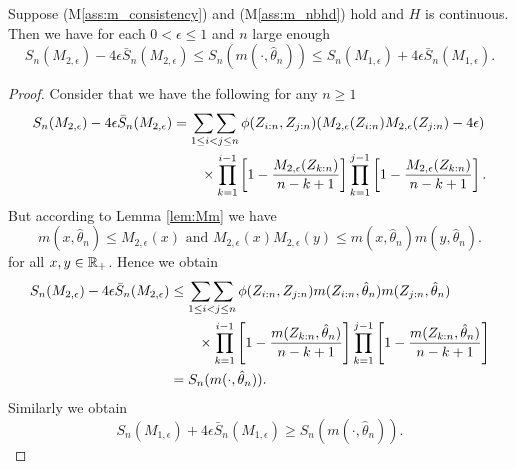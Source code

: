 \begin{cor}
	Suppose (M\ref{ass:m_consistency}) and (M\ref{ass:m_nbhd}) hold and $H$ is continuous. Then we have for each $0 < \epsilon \leq 1$ and $n$ large enough
	$$S_n(M_{2,\epsilon}) - 4\epsilon \bar{S}_n(M_{2,\epsilon}) \leq S_n(m(\cdot, \hat\theta_n)) \leq S_n(M_{1,\epsilon}) + 4\epsilon \bar{S}_n(M_{1,\epsilon})\textrm{.}$$
	\label{lem:sandwich}
	\begin{proof}
		Consider that we have the following for any $n\geq 1$
		\begin{align*}
			S_n(M_{2,\epsilon}) - 4\epsilon \bar{S}_n(M_{2,\epsilon}) &= \mathop{\sum\sum}\limits_{1\leq i<j\leq n} \phi(Z_{i:n}, Z_{j:n}) (M_{2,\epsilon}(Z_{i:n}) M_{2,\epsilon}(Z_{j:n}) - 4\epsilon) \\
			&\qquad \times \prod_{k=1}^{i-1}\left[1-\frac{M_{2,\epsilon}(Z_{k:n})}{n-k+1}\right] \prod_{k=1}^{j-1}\left[1-\frac{M_{2,\epsilon}(Z_{k:n})}{n-k+1}\right]\textrm{.}
		\end{align*}
		But according to Lemma \ref{lem:Mm} we have 
		$$m(x,\hat\theta_n) \leq M_{2,\epsilon}(x) \textrm{ and } M_{2,\epsilon}(x)M_{2,\epsilon}(y) \leq m(x,\hat\theta_n)m(y,\hat\theta_n)\textrm{.}$$
		for all $x,y \in \mathbb{R}_+$. Hence we obtain
		\begin{align*}
		S_n(M_{2,\epsilon}) - 4\epsilon \bar{S}_n(M_{2,\epsilon}) &\leq \mathop{\sum\sum}\limits_{1\leq i<j\leq n} \phi(Z_{i:n}, Z_{j:n}) m(Z_{i:n},\hat\theta_n)m(Z_{j:n},\hat\theta_n) \\
		&\qquad \times \prod_{k=1}^{i-1}\left[1-\frac{m(Z_{k:n},\hat\theta_n)}{n-k+1}\right] \prod_{k=1}^{j-1}\left[1-\frac{m(Z_{k:n},\hat\theta_n)}{n-k+1}\right]\\
		&= S_n(m(\cdot, \hat\theta_n))\textrm{.}
		\end{align*}
		Similarly we obtain 
		$$S_n(M_{1,\epsilon}) + 4\epsilon \bar{S}_n(M_{1,\epsilon}) \geq S_n(m(\cdot, \hat\theta_n)) \textrm{.}$$
	\end{proof}
\end{cor}

